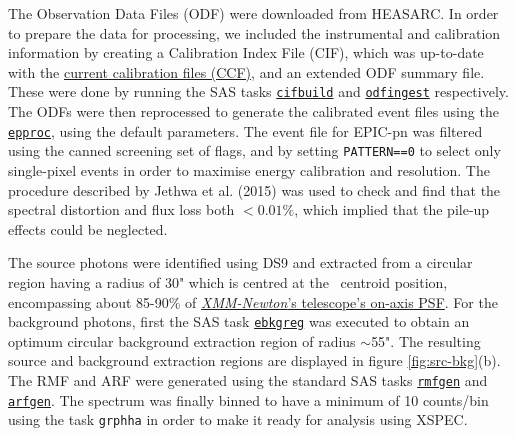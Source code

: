     	The Observation Data Files (ODF) were downloaded from HEASARC. In order to prepare the data for processing, we included the instrumental and calibration information by creating a Calibration Index File (CIF), which was up-to-date with the %
    	\href{https://www.cosmos.esa.int/web/xmm-newton/current-calibration-files}{current calibration files (CCF)}, and an extended ODF summary file. These were done by running the SAS tasks \href{https://heasarc.gsfc.nasa.gov/docs/xmm/sas/USG/cifbuild.html}{\texttt{cifbuild}} and \href{https://heasarc.gsfc.nasa.gov/docs/xmm/sas/USG/odfingest.html}{\texttt{odfingest}} respectively. The ODFs were then reprocessed to generate the calibrated event files using the \href{https://heasarc.gsfc.nasa.gov/docs/xmm/sas/help/epproc/index.html}{\texttt{epproc}}, using the default parameters. The event file for EPIC-pn was filtered using the canned screening set of flags, and by setting \texttt{PATTERN==0} to select only single-pixel events in order to maximise energy calibration and resolution. The procedure described by Jethwa et al. (2015) \cite{jethwa2015pile} was used to check and find that the spectral distortion and flux loss both $<0.01\%$, which implied that the pile-up effects could be neglected.
    
    	The source photons were identified using DS9 and extracted from a circular region having a radius of 30" which is centred at the \source\ centroid position, encompassing about 85-90\% of %
    	\href{https://xmm-tools.cosmos.esa.int/external/xmm_user_support/documentation/uhb/onaxisxraypsf.html}{\textit{XMM-Newton}'s telescope's on-axis PSF}. For the background photons, first the SAS task \href{https://heasarc.gsfc.nasa.gov/docs/xmm/sas/help/ebkgreg/ebkgreg.html}{\texttt{ebkgreg}} was executed to obtain an optimum circular background extraction region of radius $\sim$55". The resulting source and background extraction regions are displayed in figure \ref{fig:src-bkg}(b). The RMF and ARF were generated using the standard SAS tasks \href{http://xmm-tools.cosmos.esa.int/external/sas/current/doc/rmfgen/index.html}{\texttt{rmfgen}} and \href{http://xmm-tools.cosmos.esa.int/external/sas/current/doc/arfgen/index.html}{\texttt{arfgen}}. The spectrum was finally binned to have a minimum of 10 counts/bin using the task \texttt{grphha} in order to make it ready for analysis using XSPEC.
    
